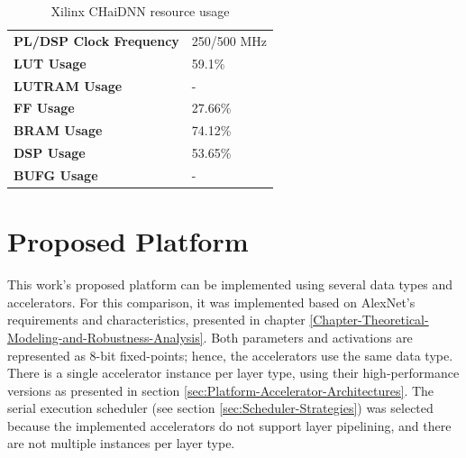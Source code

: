 \begin{table}[H]
	\caption{Xilinx CHaiDNN resource usage}
	\label{tab:CHaiDNN-resource-usage}
	\centering
	\begin{tabular}{ll}
		\toprule
		\textbf{PL/DSP Clock Frequency} & 250/500 MHz\\
		\textbf{LUT Usage} & 59.1\%\\
		\textbf{LUTRAM Usage} & -\\
		\textbf{FF Usage} & 27.66\%\\
		\textbf{BRAM Usage} & 74.12\%\\
		\textbf{DSP Usage} & 53.65\%\\
		\textbf{BUFG Usage} & -\\
		\bottomrule
	\end{tabular}
\end{table}



\section{Proposed Platform}
\label{sec:proposed-platform-implementation}
This work's proposed platform can be implemented using several data types and accelerators. For this comparison, it was implemented based on AlexNet's requirements and characteristics, presented in chapter \ref{Chapter-Theoretical-Modeling-and-Robustness-Analysis}. Both parameters and activations are represented as 8-bit fixed-points; hence, the accelerators use the same data type. There is a single accelerator instance per layer type, using their high-performance versions as presented in section \ref{sec:Platform-Accelerator-Architectures}. The serial execution scheduler (see section \ref{sec:Scheduler-Strategies}) was selected because the implemented accelerators do not support layer pipelining, and there are not multiple instances per layer type.

